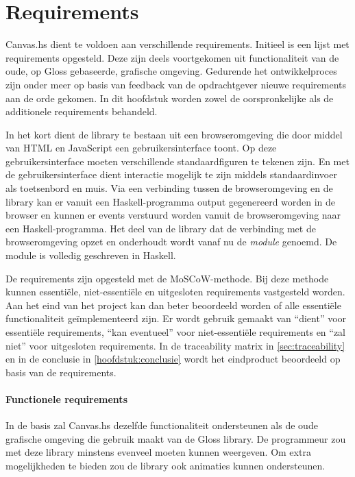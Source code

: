 \chapter{Requirements} \label{hoofdstuk:requirements}
Canvas.hs dient te voldoen aan verschillende requirements. Initieel is een lijst met requirements opgesteld. Deze zijn deels voortgekomen uit functionaliteit van de oude, op Gloss gebaseerde, grafische omgeving. Gedurende het ontwikkelproces zijn onder meer op basis van feedback van de opdrachtgever nieuwe requirements aan de orde gekomen. In dit hoofdstuk worden zowel de oorspronkelijke als de additionele requirements behandeld.

In het kort dient de library te bestaan uit een browseromgeving die door middel van HTML en JavaScript een gebruikersinterface toont. Op deze gebruikersinterface moeten verschillende standaardfiguren te tekenen zijn. En met de gebruikersinterface dient interactie mogelijk te zijn middels standaardinvoer als toetsenbord en muis. Via een verbinding tussen de browseromgeving en de library kan er vanuit een Haskell-programma output gegenereerd worden in de browser en kunnen er events verstuurd worden vanuit de browseromgeving naar een Haskell-programma. Het deel van de library dat de verbinding met de browseromgeving opzet en onderhoudt wordt vanaf nu de \emph{module} genoemd. De module is volledig geschreven in Haskell.

De requirements zijn opgesteld met de MoSCoW-methode. Bij deze methode kunnen essenti\"ele, niet-essenti\"ele en uitgesloten requirements vastgesteld worden. Aan het eind van het project kan dan beter beoordeeld worden of alle essenti\"ele functionaliteit ge\"implementeerd zijn. Er wordt gebruik gemaakt van ``dient'' voor essenti\"ele requirements, ``kan eventueel'' voor niet-essenti\"ele requirements en ``zal niet'' voor uitgesloten requirements. In de traceability matrix in \autoref{sec:traceability} en in de conclusie in \autoref{hoofdstuk:conclusie} wordt het eindproduct beoordeeld op basis van de requirements.

\subsubsection{Functionele requirements}
In de basis zal Canvas.hs dezelfde functionaliteit ondersteunen als de oude grafische omgeving die gebruik maakt van de Gloss library. De programmeur zou met deze library minstens evenveel moeten kunnen weergeven. Om extra mogelijkheden te bieden zou de library ook animaties kunnen ondersteunen.

